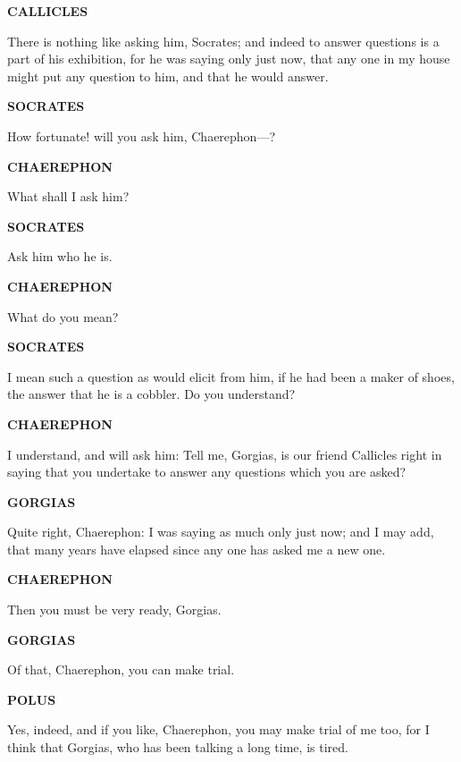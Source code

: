 \documentclass[11pt,letter]{article}
\begin{document}
\par \textbf{CALLICLES}
\par   There is nothing like asking him, Socrates; and indeed to answer questions is a part of his exhibition, for he was saying only just now, that any one in my house might put any question to him, and that he would answer.

\par \textbf{SOCRATES}
\par   How fortunate! will you ask him, Chaerephon—?

\par \textbf{CHAEREPHON}
\par   What shall I ask him?

\par \textbf{SOCRATES}
\par   Ask him who he is.

\par \textbf{CHAEREPHON}
\par   What do you mean?

\par \textbf{SOCRATES}
\par   I mean such a question as would elicit from him, if he had been a maker of shoes, the answer that he is a cobbler. Do you understand?

\par \textbf{CHAEREPHON}
\par   I understand, and will ask him:  Tell me, Gorgias, is our friend Callicles right in saying that you undertake to answer any questions which you are asked?

\par \textbf{GORGIAS}
\par   Quite right, Chaerephon:  I was saying as much only just now; and I may add, that many years have elapsed since any one has asked me a new one.

\par \textbf{CHAEREPHON}
\par   Then you must be very ready, Gorgias.

\par \textbf{GORGIAS}
\par   Of that, Chaerephon, you can make trial.

\par \textbf{POLUS}
\par   Yes, indeed, and if you like, Chaerephon, you may make trial of me too, for I think that Gorgias, who has been talking a long time, is tired.
\end{document}
